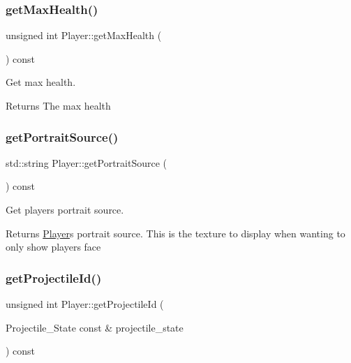 \subsubsection{\texorpdfstring{get\+Max\+Health()}{getMaxHealth()}}
{\footnotesize\ttfamily unsigned int Player\+::get\+Max\+Health (\begin{DoxyParamCaption}{ }\end{DoxyParamCaption}) const}



Get max health. 

\begin{DoxyReturn}{Returns}
The max health 
\end{DoxyReturn}
\mbox{\label{classPlayer_a6e54a09592987eef8d690ef06d815d6b}} 
\subsubsection{\texorpdfstring{get\+Portrait\+Source()}{getPortraitSource()}}
{\footnotesize\ttfamily std\+::string Player\+::get\+Portrait\+Source (\begin{DoxyParamCaption}{ }\end{DoxyParamCaption}) const}



Get player\textquotesingle{}s portrait source. 

\begin{DoxyReturn}{Returns}
\hyperlink{classPlayer}{Player}\textquotesingle{}s portrait source. This is the texture to display when wanting to only show player\textquotesingle{}s face 
\end{DoxyReturn}
\mbox{\label{classPlayer_a46eff785fb376112059c90a137ac25f7}} 
\subsubsection{\texorpdfstring{get\+Projectile\+Id()}{getProjectileId()}}
{\footnotesize\ttfamily unsigned int Player\+::get\+Projectile\+Id (\begin{DoxyParamCaption}\item[{Projectile\+\_\+\+State const \&}]{projectile\+\_\+state }\end{DoxyParamCaption}) const}



